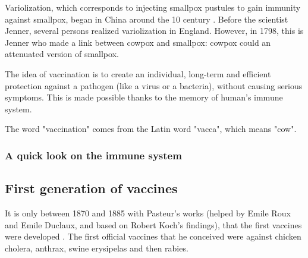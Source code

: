\documentclass{article}
\begin{document}
            Variolization, which corresponds to injecting smallpox pustules to gain immunity against smallpox, began in China around the 10 century \autocite{canouiHistoryPrinciplesVaccination2019}. 
            Before the scientist Jenner, several persons realized variolization in England. However, in 1798, this is Jenner who made a link between cowpox and smallpox: 
                cowpox could an attenuated version of smallpox.            

            The idea of vaccination is to create an individual, long-term and efficient protection against a pathogen (like a virus or a bacteria), without causing serious symptoms.
            This is made possible thanks to the memory of human's immune system.

            The word "vaccination" comes from the Latin word "vacca", which means "cow".


            \subsubsection{A quick look on the immune system}










        \subsection{First generation of vaccines}
            
            It is only between 1870 and 1885 with Pasteur's works (helped by Emile Roux and Emile Duclaux, and based on Robert Koch's findings), that the first vaccines were developed \autocite{plotkinHistoryVaccination2014}.
            The first official vaccines that he conceived were against chicken cholera, anthrax, swine erysipelas and then rabies.
\end{document}
